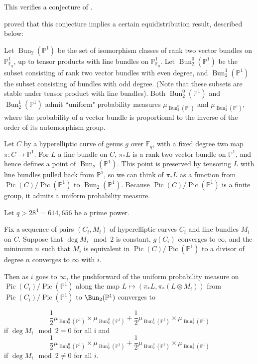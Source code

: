 This verifies a conjecture of \citet[Conjecture 1.4]{TS}.

\citet[Theorem 4.4]{TS} proved that this conjecture implies a certain equidistribution result, described below:

Let $\operatorname{Bun}_2(\mathbb P^1)$ be the set of isomorphism classes of rank two vector bundles on $\mathbb P^1_{\mathbb F_q}$, up to tensor products with line bundles on $\mathbb P^1_{\mathbb F_q}$. Let $\operatorname{Bun}_2^0(\mathbb P^1)$ be the subset consisting of rank two vector bundles with even degree, and $\operatorname{Bun}_2^1(\mathbb P^1)$ the subset consisting of bundles with odd degree. (Note that these subsets are stable under tensor product with line bundles).  Both $\operatorname{Bun}_2^0(\mathbb P^1)$ and $\operatorname{Bun}_2^1 (\mathbb P^1)$ admit ``uniform" probability measures $\mu_{ \operatorname{Bun}_2^0(\mathbb P^1)} $ and $\mu_{\operatorname{Bun}_2^1 (\mathbb P^1)}$, where the probability of a vector bundle is proportional to the inverse of the order of its automorphism group.

Let $C$ by a hyperelliptic curve of genus $g$ over $\mathbb F_q$, with a fixed degree two map $\pi: C \to \mathbb P^1$. For $L$ a line bundle on $C$, $\pi_* L$ is a rank two vector bundle on $\mathbb P^1$, and hence defines a point of $\operatorname{Bun}_2(\mathbb P^1)$. This point is preserved by tensoring $L$ with line bundles pulled back from $\mathbb P^1$, so we can think of $\pi_* L$ as a function from $\operatorname{Pic}(C)/ \operatorname{Pic}( \mathbb P^1) $ to $\operatorname{Bun}_2(\mathbb P^1)$. Because  $\operatorname{Pic}(C)/ \operatorname{Pic}( \mathbb P^1) $ is a finite group, it admits a uniform probability measure.

\begin{theorem}
\notready\label{equidistribution-statement} Let $q> 28^4=  614,656$ be a prime power.

Fix a sequence of pairs $(C_i,M_i)$ of hyperelliptic curves $C_i$ and line bundles $M_i$ on $C$. Suppose that $\deg M_i \mod 2$ is constant, $g(C_i)$ converges to $\infty$, and the minimum $n$ such that $M_i$ is equivalent in $\operatorname{Pic}(C)/ \operatorname{Pic}( \mathbb P^1) $ to a divisor of degree $n$ converges to $\infty$ with $i$.

Then as $i$ goes to $\infty$, the pushforward of the uniform probability measure on  $\operatorname{Pic}(C_i)/ \operatorname{Pic}( \mathbb P^1) $ along the map $ L \mapsto (\pi_* L, \pi_* (L \otimes M_i)) $ from $\operatorname{Pic}(C_i)/ \operatorname{Pic}( \mathbb P^1) $  to $\Bun_2(\mathbb P^1)$ converges to

\[ \frac{1}{2}  \mu_{ \operatorname{Bun}_2^0(\mathbb P^1)} \times \mu_{ \operatorname{Bun}_2^0(\mathbb P^1)} + \frac{1}{2} \mu_{ \operatorname{Bun}_2^1(\mathbb P^1)}\times \mu_{ \operatorname{Bun}_2^1(\mathbb P^1)}\] if $\deg M_i \mod 2=0$ for all i and \[ \frac{1}{2}  \mu_{ \operatorname{Bun}_2^0(\mathbb P^1)} \times \mu_{ \operatorname{Bun}_2^1(\mathbb P^1)} + \frac{1}{2} \mu_{ \operatorname{Bun}_2^0(\mathbb P^1)}\times \mu_{ \operatorname{Bun}_2^1(\mathbb P^1)}\] if $\deg M_i \mod 2 \neq 0$ for all $i$. \end{theorem}

